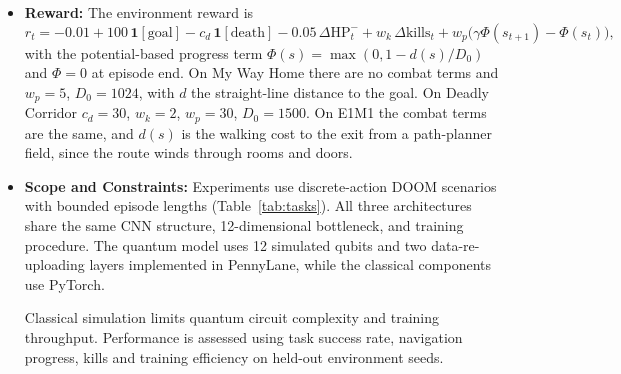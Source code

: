 \documentclass[10pt, a4paper]{article}
\begin{document}
\begin{itemize}
    \textbf{E1M1 imitation objective.} PPO from scratch did not learn E1M1 (Section~\ref{sec:results_analysis}),
    so the E1M1 policies are trained by DAgger imitation \cite{ross_dagger_2011} of a scripted teacher
    $\pi_T$ that reads private game state. With teacher action $a^\star_t=\pi_T(s_t)$ on the states $o_t$ visited by
    the current student, the loss is
    \begin{equation}
        \mathcal{L}_{\mathrm{BC}}=-\mathbb{E}_{o_t\sim\mathcal{D}}\!\left[w_{a^\star_t}\log\pi(a^\star_t|\mathbf{z}_t)\right]
        +c_a\mathcal{L}_{\mathrm{aux}},\qquad w_a\propto f_a^{-0.75},
    \end{equation}
    where $f_a$ is the frequency of action $a$ in the aggregated dataset $\mathcal{D}$ (so that rare actions such
    as USE are not ignored). After each round the student drives, the teacher labels the visited states,
    and they are added to $\mathcal{D}$.

    \item \textbf{Reward:}
    The environment reward is
    \begin{equation}
        r_t=-0.01+100\,\mathbf{1}[\text{goal}]-c_d\,\mathbf{1}[\text{death}]-0.05\,\Delta\mathrm{HP}^{-}_t+w_k\,\Delta\mathrm{kills}_t
        +w_p\big(\gamma\Phi(s_{t+1})-\Phi(s_t)\big),
    \end{equation}
    with the potential-based progress term $\Phi(s)=\max(0,1-d(s)/D_0)$ and $\Phi=0$ at episode end.
    On My Way Home there are no combat terms and $w_p=5$, $D_0=1024$, with $d$ the straight-line
    distance to the goal. On Deadly Corridor $c_d=30$, $w_k=2$, $w_p=30$, $D_0=1500$. On E1M1 the combat terms are the same,
    and $d(s)$ is the walking cost to the exit from a path-planner field, since the route winds through rooms and doors.

    \item \textbf{Scope and Constraints:}
    Experiments use discrete-action DOOM scenarios
    with bounded episode lengths (Table~\ref{tab:tasks}).
    All three architectures share the same CNN
    structure, 12-dimensional bottleneck, and training
    procedure. The quantum model uses
    12 simulated qubits and two data-re-uploading
    layers implemented in PennyLane, while the
    classical components use PyTorch.

    Classical simulation limits quantum circuit
    complexity and training throughput. Performance
    is assessed using task success rate, navigation
    progress, kills and training efficiency on held-out
    environment seeds.
\end{itemize}
\end{document}
